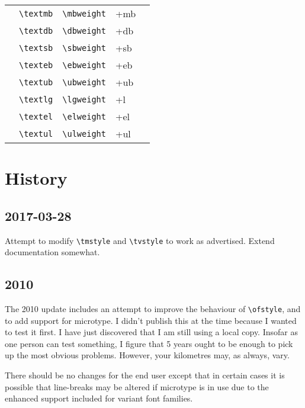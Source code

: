 \documentclass[pagesize=auto, fontsize=10pt, DIV=11]{scrartcl}
\newcommand*{\pkg}[1]{\mbox{\textsf{#1}}}
\newcommand*{\cs}[1]{\texttt{\textbackslash #1}}
\begin{document}
\begin{longtable}{lll>{\ttfamily}ll}
  \cmidrule(lr){1-5}
  & \cs{textmb} & \cs{mbweight} & +mb & \\
  & \cs{textdb} & \cs{dbweight} & +db & \\
  & \cs{textsb} & \cs{sbweight} & +sb & \\
  & \cs{texteb} & \cs{ebweight} & +eb & \\
  & \cs{textub} & \cs{ubweight} & +ub & \\
  & \cs{textlg} & \cs{lgweight} & +l & \\
  & \cs{textel} & \cs{elweight} & +el & \\
  & \cs{textul} & \cs{ulweight} & +ul & \\
\end{longtable}

\section*{History}

\subsection*{2017-03-28}
Attempt to modify \cs{tmstyle} and \cs{tvstyle} to work as advertised.
Extend documentation somewhat.

\subsection*{2010}
The 2010 update includes an attempt to improve the behaviour of \verb|\ofstyle|, and to add support for \pkg{microtype}.
I didn't publish this at the time because I wanted to test it first.
I have just discovered that I am still using a local copy.
Insofar as one person can test something, I figure that 5 years ought to be enough to pick up the most obvious problems.
However, your kilometres may, as always, vary.

There should be no changes for the end user except that in certain cases it is possible that line-breaks may be altered if \pkg{microtype} is in use due to the enhanced support included for variant font families.
\end{document}
